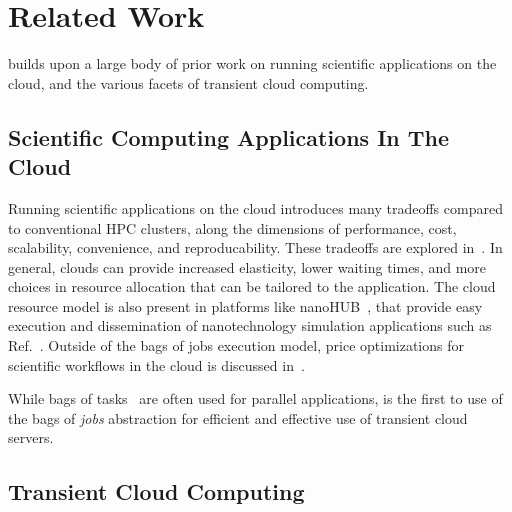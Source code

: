 \section{Related Work}
\label{sec:related}
\sysname builds upon a large body of prior work on running scientific applications on the cloud, and the various facets of transient cloud computing.  

\subsection{Scientific Computing Applications In The Cloud}

Running scientific applications on the cloud introduces many tradeoffs compared to conventional HPC clusters, along the dimensions of performance, cost, scalability, convenience, and reproducability.
These tradeoffs are explored in~\cite{iosup_performance_2011, zhai_cloud_2011, marathe2013comparative, galante_analysis_2016, benedictis_cloud-aware_2014}.
In general, clouds can provide increased elasticity, lower waiting times, and more choices in resource allocation that can be tailored to the application.
The cloud resource model is also present in platforms like nanoHUB~\cite{nanohub}, that provide easy execution and dissemination of nanotechnology simulation applications such as Ref.~\cite{kadupitiya2017}.
Outside of the bags of jobs execution model, price optimizations for scientific workflows in the cloud is discussed in~\cite{gari_learning_2019}. 

While bags of tasks~\cite{varshney_autobot_2019} are often used for parallel applications, \sysname is the first to use of the bags of \emph{jobs} abstraction for efficient and effective use of transient cloud servers. 


\subsection{Transient Cloud Computing}

